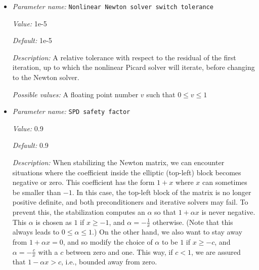 \begin{itemize}
{\it Default:} 0.9


{\it Description:} The linear Stokes solver tolerance is dynamically chosen for the Newton solver, based on the Eisenstat walker 1994 paper (https://doi.org/10.1137/0917003), equation 2.2. Because this value can become larger then one, we limit this value by this parameter.


{\it Possible values:} A floating point number $v$ such that $0 \leq v \leq 1$
\item {\it Parameter name:} {\tt Nonlinear Newton solver switch tolerance}
\label{parameters:Solver parameters/Newton solver parameters/Nonlinear Newton solver switch tolerance}
\label{parameters:Solver_20parameters/Newton_20solver_20parameters/Nonlinear_20Newton_20solver_20switch_20tolerance}


{\it Value:} 1e-5


{\it Default:} 1e-5


{\it Description:} A relative tolerance with respect to the residual of the first iteration, up to which the nonlinear Picard solver will iterate, before changing to the Newton solver.


{\it Possible values:} A floating point number $v$ such that $0 \leq v \leq 1$
\item {\it Parameter name:} {\tt SPD safety factor}
\label{parameters:Solver parameters/Newton solver parameters/SPD safety factor}
\label{parameters:Solver_20parameters/Newton_20solver_20parameters/SPD_20safety_20factor}


{\it Value:} 0.9


{\it Default:} 0.9


{\it Description:} When stabilizing the Newton matrix, we can encounter situations where the coefficient inside the elliptic (top-left) block becomes negative or zero. This coefficient has the form $1+x$ where $x$ can sometimes be smaller than $-1$. In this case, the top-left block of the matrix is no longer positive definite, and both preconditioners and iterative solvers may fail. To prevent this, the stabilization computes an $\alpha$ so that $1+\alpha x$ is never negative. This $\alpha$ is chosen as $1$ if $x\ge -1$, and $\alpha=-\frac 1x$ otherwise. (Note that this always leads to $0\le \alpha \le 1$.)  On the other hand, we also want to stay away from $1+\alpha x=0$, and so modify the choice of $\alpha$ to be $1$ if $x\ge -c$, and $\alpha=-\frac cx$ with a $c$ between zero and one. This way, if $c<1$, we are assured that $1-\alpha x>c$, i.e., bounded away from zero.



\end{itemize}
